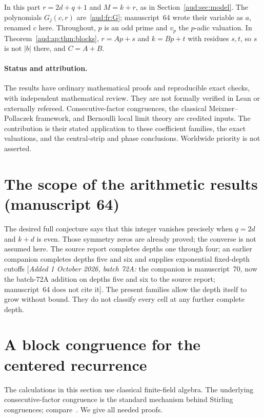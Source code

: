 \documentclass[11pt,a4paper]{article}
\numberwithin{equation}{section}
\newcommand{\addednote}[1]{{\small[\textit{Added 1 October 2026, batch 72A:} #1]}}
\begin{document}
In this part $r=2d+q+1$ and $M=k+r$, as in Section~\ref{aud:sec:model}. The polynomials $G_j(c,r)$ are~\eqref{aud:fr:G}; manuscript~64 wrote their variable as $a$, renamed $c$ here. Throughout, $p$ is an odd prime and $v_p$ the $p$-adic valuation. In Theorem~\ref{aud:ap:thm:blocks}, $r=Ap+s$ and $k=Bp+t$ with residues $s,t$, so $s$ is not $|b|$ there, and $C=A+B$.

\paragraph{Status and attribution.}
The results have ordinary mathematical proofs and reproducible exact checks, with independent mathematical review. They are not formally verified in Lean or externally refereed. Consecutive-factor congruences, the classical Meixner--Pollaczek framework, and Bernoulli local limit theory are credited inputs. The contribution is their stated application to these coefficient families, the exact valuations, and the central-strip and phase conclusions. Worldwide priority is not asserted.
\section{The scope of the arithmetic results (manuscript 64)}\label{aud:sec:apscope}

The desired full conjecture says that this integer vanishes precisely when $q=2d$ and $k+d$ is even. Those symmetry zeros are already proved; the converse is not assumed here.
The source report completes depths one through four; an earlier companion completes depths five and six and supplies exponential fixed-depth cutoffs \addednote{the companion is manuscript~70, now the batch-72A addition on depths five and six to the source report; manuscript~64 does not cite it}. The present families allow the depth itself to grow without bound. They do not classify every cell at any further complete depth.
\section{A block congruence for the centered recurrence}
The calculations in this section use classical finite-field algebra. The underlying consecutive-factor congruence is the standard mechanism behind Stirling congruences; compare~\cite{guillot}. We give all needed proofs.
\end{document}
